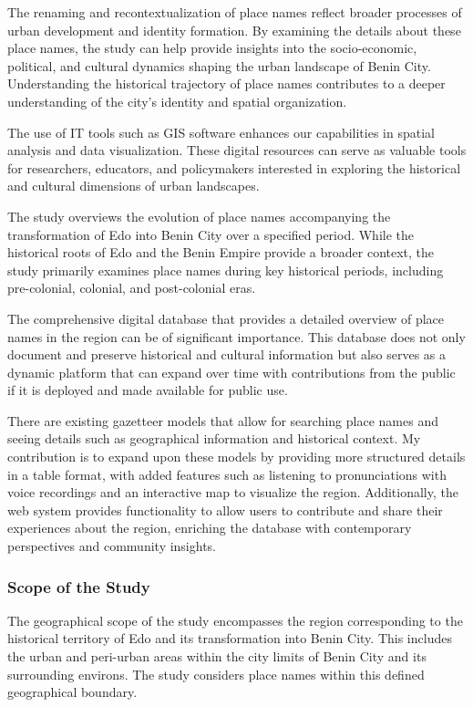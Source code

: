 The renaming and recontextualization of place names reflect broader processes of urban development and identity formation. By examining the details about these place names, the study can help provide insights into the socio-economic, political, and cultural dynamics shaping the urban landscape of Benin City. Understanding the historical trajectory of place names contributes to a deeper understanding of the city's identity and spatial organization.

The use of IT tools such as GIS software enhances our capabilities in spatial analysis and data visualization. These digital resources can serve as valuable tools for researchers, educators, and policymakers interested in exploring the historical and cultural dimensions of urban landscapes.

The study overviews the evolution of place names accompanying the transformation of Edo into Benin City over a specified period. While the historical roots of Edo and the Benin Empire provide a broader context, the study primarily examines place names during key historical periods, including pre-colonial, colonial, and post-colonial eras.

The comprehensive digital database that provides a detailed overview of place names in the region can be of significant importance. This database does not only document and preserve historical and cultural information but also serves as a dynamic platform that can expand over time with contributions from the public if it is deployed and made available for public use.

There are existing gazetteer models that allow for searching place names and seeing details such as geographical information and historical context. My contribution is to expand upon these models by providing more structured details in a table format, with added features such as listening to pronunciations with voice recordings and an interactive map to visualize the region. Additionally, the web system provides functionality to allow users to contribute and share their experiences about the region, enriching the database with contemporary perspectives and community insights.
\subsubsection{Scope of the Study}
The geographical scope of the study encompasses the region corresponding to the historical territory of Edo and its transformation into Benin City. This includes the urban and peri-urban areas within the city limits of Benin City and its surrounding environs. The study considers place names within this defined geographical boundary.


